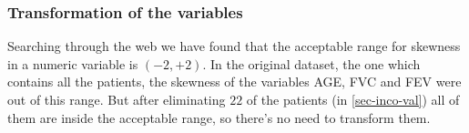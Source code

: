 \subsubsection{Transformation of the variables} \label{sec-var-trans}
Searching through the web we have found that
the acceptable range for skewness in a numeric
variable is $(-2, +2)$. In the original dataset, the one which contains all the patients, the skewness of the variables AGE, FVC and FEV were out of this range. But after eliminating $22$ of the patients (in \ref{sec-inco-val}) all of them are inside the acceptable range, so there's no need to transform them.

%
%








%

